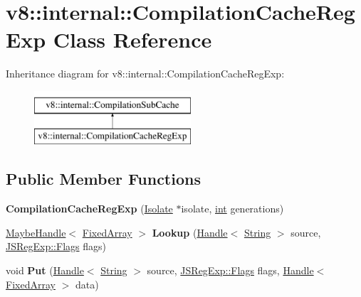 \hypertarget{classv8_1_1internal_1_1CompilationCacheRegExp}{}\section{v8\+:\+:internal\+:\+:Compilation\+Cache\+Reg\+Exp Class Reference}
\label{classv8_1_1internal_1_1CompilationCacheRegExp}
Inheritance diagram for v8\+:\+:internal\+:\+:Compilation\+Cache\+Reg\+Exp\+:\begin{figure}[H]
\begin{center}
\leavevmode
\includegraphics[height=2.000000cm]{classv8_1_1internal_1_1CompilationCacheRegExp}
\end{center}
\end{figure}
\subsection*{Public Member Functions}
\begin{DoxyCompactItemize}
\item 
\mbox{\label{classv8_1_1internal_1_1CompilationCacheRegExp_ada53fa1cf4c913dba298fc11f491324b}} 
{\bfseries Compilation\+Cache\+Reg\+Exp} (\mbox{\hyperlink{classv8_1_1internal_1_1Isolate}{Isolate}} $\ast$isolate, \mbox{\hyperlink{classint}{int}} generations)
\item 
\mbox{\label{classv8_1_1internal_1_1CompilationCacheRegExp_a0bb213af930b7215707b5da49f142ba8}} 
\mbox{\hyperlink{classv8_1_1internal_1_1MaybeHandle}{Maybe\+Handle}}$<$ \mbox{\hyperlink{classv8_1_1internal_1_1FixedArray}{Fixed\+Array}} $>$ {\bfseries Lookup} (\mbox{\hyperlink{classv8_1_1internal_1_1Handle}{Handle}}$<$ \mbox{\hyperlink{classv8_1_1internal_1_1String}{String}} $>$ source, \mbox{\hyperlink{classv8_1_1base_1_1Flags}{J\+S\+Reg\+Exp\+::\+Flags}} flags)
\item 
\mbox{\label{classv8_1_1internal_1_1CompilationCacheRegExp_aba3d849c1552a2c1327504221f81279c}} 
void {\bfseries Put} (\mbox{\hyperlink{classv8_1_1internal_1_1Handle}{Handle}}$<$ \mbox{\hyperlink{classv8_1_1internal_1_1String}{String}} $>$ source, \mbox{\hyperlink{classv8_1_1base_1_1Flags}{J\+S\+Reg\+Exp\+::\+Flags}} flags, \mbox{\hyperlink{classv8_1_1internal_1_1Handle}{Handle}}$<$ \mbox{\hyperlink{classv8_1_1internal_1_1FixedArray}{Fixed\+Array}} $>$ data)
\end{DoxyCompactItemize}
